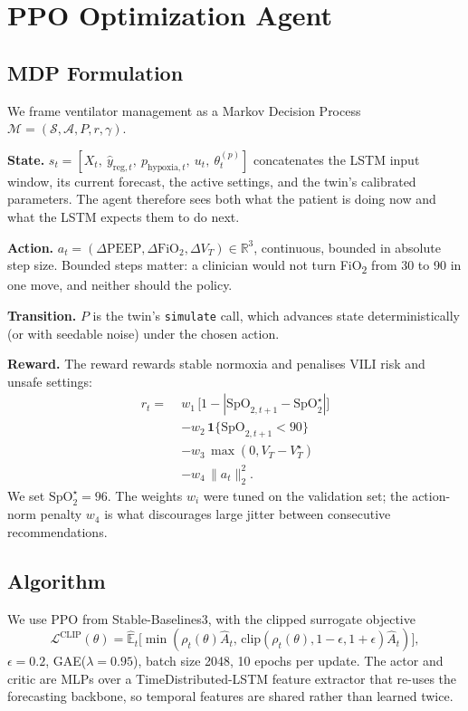 \documentclass[conference]{IEEEtran}
\begin{document}
\section{PPO Optimization Agent}
\label{sec:ppo}

\subsection{MDP Formulation}
We frame ventilator management as a Markov Decision Process $\mathcal{M}=(\mathcal{S},\mathcal{A},P,r,\gamma)$.

\textbf{State.} $s_t = [X_t,\ \hat{y}_{\text{reg},t},\ p_{\text{hypoxia},t},\ u_t,\ \theta^{(p)}_t]$ concatenates the LSTM input window, its current forecast, the active settings, and the twin's calibrated parameters. The agent therefore sees both what the patient is doing now and what the LSTM expects them to do next.

\textbf{Action.} $a_t = (\Delta\text{PEEP}, \Delta\text{FiO}_2, \Delta V_T) \in \mathbb{R}^3$, continuous, bounded in absolute step size. Bounded steps matter: a clinician would not turn FiO\textsubscript{2} from 30 to 90 in one move, and neither should the policy.

\textbf{Transition.} $P$ is the twin's \texttt{simulate} call, which advances state deterministically (or with seedable noise) under the chosen action.

\textbf{Reward.} The reward rewards stable normoxia and penalises VILI risk and unsafe settings:
\begin{align}
  r_t = \;& w_1\,\big[1 - |\text{SpO}_{2,t+1}-\text{SpO}^{\star}_2|\big]\nonumber\\
            & - w_2\,\mathbf{1}\{\text{SpO}_{2,t+1}<90\}\nonumber\\
            & - w_3\,\max(0, V_T - V_T^{\star})\nonumber\\
            & - w_4\,\|a_t\|_2^2.
\end{align}
We set $\text{SpO}^{\star}_2{=}96$. The weights $w_i$ were tuned on the validation set; the action-norm penalty $w_4$ is what discourages large jitter between consecutive recommendations.

\subsection{Algorithm}
We use PPO \cite{schulman2017ppo} from Stable-Baselines3, with the clipped surrogate objective
\[
  \mathcal{L}^{\text{CLIP}}(\theta)=\hat{\mathbb{E}}_t\big[\min(\rho_t(\theta)\hat{A}_t,\, \mathrm{clip}(\rho_t(\theta), 1-\epsilon, 1+\epsilon)\hat{A}_t)\big],
\]
$\epsilon{=}0.2$, GAE($\lambda{=}0.95$), batch size 2048, 10 epochs per update. The actor and critic are MLPs over a TimeDistributed-LSTM feature extractor that re-uses the forecasting backbone, so temporal features are shared rather than learned twice.
\end{document}
